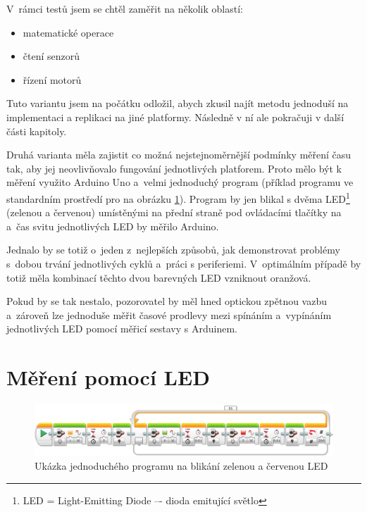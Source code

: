 V~rámci testů jsem se chtěl zaměřit na několik oblastí: %

\begin{itemize}
	\item matematické operace
	\item čtení senzorů
	\item řízení motorů
\end{itemize}  

Tuto variantu jsem na počátku odložil, abych zkusil najít metodu jednoduší na implementaci a replikaci na jiné platformy. Následně v ní ale pokračuji v další části kapitoly.

Druhá varianta měla zajistit co možná nejstejnoměrnější podmínky měření času tak, aby jej neovlivňovalo fungování jednotlivých platforem. 
Proto mělo být k měření využito Arduino Uno a~velmi jednoduchý program  (příklad programu ve standardním prostředí pro \EVthree{ }na obrázku \ref{fig:LoopTimeLEDblinking-measuring}).
Program by jen blikal s dvěma LED\footnote{LED = Light-Emitting Diode –- dioda emitující světlo} (zelenou a červenou) umístěnými na přední straně pod ovládacími tlačítky na  a~čas svitu jednotlivých LED by měřilo Arduino.




Jednalo by se totiž o~jeden z~nejlepších způsobů, jak demonstrovat problémy s~dobou trvání jednotlivých cyklů a~práci s periferiemi. 
V~optimálním případě by totiž měla kombinací těchto dvou barevných LED vzniknout oranžová. 

Pokud by se tak nestalo, pozorovatel by měl hned optickou zpětnou vazbu a~zároveň lze jednoduše měřit časové prodlevy mezi spínáním a~vypínáním jednotlivých LED pomocí měřicí sestavy s Arduinem.

\section{Měření pomocí LED}


\begin{figure}[h]
	\centering
	\includegraphics[width=\textwidth]{images/measuring-ev3-software_LoopTimeLEDblinking.png}
	\caption[Ukázka jednoduchého programu na blikání zelenou a červenou LED]{Ukázka jednoduchého programu na blikání zelenou a červenou LED}
	\label{fig:LoopTimeLEDblinking-measuring}
\end{figure}

